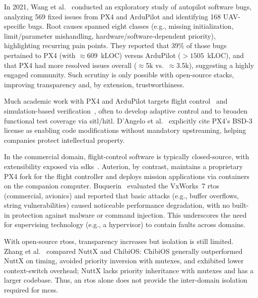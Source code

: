 In 2021, Wang et al.~\cite{wang_exploratory_2021} conducted an exploratory study
of autopilot software bugs, analyzing 569 fixed issues from PX4 and ArduPilot
and identifying 168 UAV-specific bugs. Root causes spanned eight classes (e.g.,
missing initialization, limit/parameter mishandling, hardware/software-dependent
priority), highlighting recurring pain points. They reported that 39\% of those
bugs pertained to PX4 (with \(\approx\)609~kLOC) versus ArduPilot (\(>1505\)~kLOC), and
that PX4 had more resolved issues overall (\(\approx\)5k vs.\ \(\approx\)3.5k), suggesting
a highly engaged community. Such scrutiny is only possible with open-source
stacks, improving transparency and, by extension, trustworthiness.

Much academic work with PX4 and ArduPilot targets flight
control~\cite{li_embedding_2022,li_plug-and-play_2021,baldi_ardupilot-based_2022,dangelo_efficient_2024}
and simulation-based
verification~\cite{baldi_ardupilot-based_2022,dang_nguyen_vision-based_2019,dai_rflysim_2021},
often to develop adaptive control and to broaden functional test coverage via
\gls{sitl}/\gls{hitl}.
D'Angelo et al.~\cite{dangelo_efficient_2024} explicitly cite PX4's BSD-3
license as enabling code modifications without mandatory upstreaming, helping
companies protect intellectual property.
%

In the commercial domain, flight-control software is typically closed-source,
with extensibility exposed via \glspl{sdk}~\cite{parrot-sdk}. Auterion, by
contrast, maintains a proprietary PX4 fork for the flight controller and deploys mission applications via containers on the companion computer. %
%
Buquerin~\cite{buquerin2018security} evaluated the
VxWorks~7 \gls{rtos} (commercial, avionics) and reported that basic attacks (e.g., buffer overflows, string vulnerabilities) caused noticeable performance degradation, with no built-in protection against malware or command injection.
This underscores the need for supervising technology (e.g., a hypervisor) to contain faults across domains.

With open-source \glspl{rtos}, transparency increases but isolation is still limited.
Zhang et al.~\cite{zhang2021best} compared NuttX and ChibiOS: ChibiOS generally
outperformed NuttX on timing, avoided priority inversion with mutexes, and
exhibited lower context-switch overhead; NuttX lacks priority inheritance with
mutexes and has a larger codebase.
Thus, an \gls{rtos} alone does not provide the inter-domain isolation required for \glspl{mcs}.

